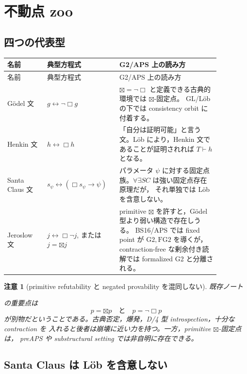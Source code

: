 ﻿\documentclass[a4paper,10pt]{ltjsarticle}
\newtheorem{remark}[theorem]{注意}
\newcommand{\Gtwo}{\mathrm{G2}}
\newcommand{\FGtwo}{\mathrm{FG2}}
\newcommand{\Boxop}{\Box}
\newcommand{\Btx}{\boxtimes}
\begin{document}
\section{不動点 zoo}

\subsection{四つの代表型}

\begin{longtable}{>{\raggedright\arraybackslash}p{0.17\linewidth}
>{\raggedright\arraybackslash}p{0.27\linewidth}
>{\raggedright\arraybackslash}p{0.43\linewidth}}
\toprule
名前 & 典型方程式 & G2/APS 上の読み方 \\
\midrule
\endfirsthead
\toprule
名前 & 典型方程式 & G2/APS 上の読み方 \\
\midrule
\endhead
Gödel 文 &
\(g\leftrightarrow\neg\Boxop g\) &
\(\Btx=\neg\Boxop\) と定義できる古典的環境では \(\Btx\)-固定点。
GL/Löb の下では consistency orbit に付着する。\\
Henkin 文 &
\(h\leftrightarrow\Boxop h\) &
「自分は証明可能」と言う文。Löb により，Henkin 文であることが証明されれば
\(T\vdash h\) となる。\\
Santa Claus 文 &
\(s_\psi\leftrightarrow(\Boxop s_\psi\to\psi)\) &
パラメータ \(\psi\) に対する固定点族。\(\forall\exists SC\) は強い固定点存在原理だが，
それ単独では Löb を含意しない。\\
Jeroslow 文 &
\(j\leftrightarrow\Boxop\neg j\), または \(j=\Btx j\) &
primitive \(\Btx\) を許すと，Gödel 型より弱い構造で存在しうる。
BS16/APS では fixed point が \(\Gtwo,\FGtwo\) を導くが，contraction-free な剰余付き読解では
formalized G2 と分離される。\\
\bottomrule
\end{longtable}

\begin{remark}[primitive refutability と negated provability を混同しない]
既存ノート
\begin{quote}\small
{}
\end{quote}
の重要点は
\[
p=\Btx p
\quad\text{と}\quad
p=\neg\Boxop p
\]
が別物だということである。古典否定，爆発，D/4 型 introspection，十分な contraction を
入れると後者は崩壊に近い力を持つ。一方，primitive \(\Btx\)-固定点は，
preAPS や substructural setting では非自明に存在できる。
\end{remark}

\subsection{Santa Claus は Löb を含意しない}
\end{document}
